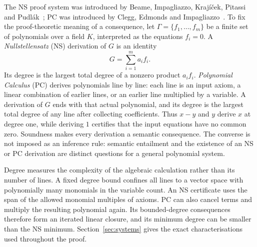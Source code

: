 \documentclass[11pt,a4paper]{article}
\theoremstyle{definition}\newtheorem{definition}[theorem]{Definition}
\theoremstyle{remark}\newtheorem{remark}[theorem]{Remark}
\begin{document}
The NS proof system was introduced by Beame, Impagliazzo,
Kraj\'i\v cek, Pitassi and Pudl\'ak~\cite{NSFoundations}; PC was
introduced by Clegg, Edmonds and Impagliazzo~\cite{PCFoundations}.
To fix the proof-theoretic meaning of a consequence, let
$\Gamma=\{f_1,\ldots,f_m\}$ be a finite set of polynomials over a field
$K$, interpreted as the equations $f_i=0$. A \emph{Nullstellensatz}
(NS) derivation of $G$ is an identity
\[
                         G=\sum_{i=1}^m a_i f_i.
\]
Its degree is the largest total degree of a nonzero product $a_i f_i$.
\emph{Polynomial Calculus} (PC) derives polynomials line by line: each
line is an input axiom, a linear combination of earlier lines, or an
earlier line multiplied by a variable. A derivation of $G$ ends with
that actual polynomial, and its degree is the largest total degree
of any line after collecting coefficients. Thus $x-y$ and $y$ derive
$x$ at degree one, while deriving $1$ certifies that the input equations
have no common zero. Soundness makes every derivation a semantic
consequence. The converse is not imposed as an inference rule:
semantic entailment and the existence of an NS or PC derivation are
distinct questions for a general polynomial system.

Degree measures the complexity of the algebraic calculation rather
than its number of lines. A fixed degree bound confines all lines to
a vector space with polynomially many monomials in the variable count.
An NS certificate uses the span of the allowed monomial multiples of
axioms. PC can also cancel terms and multiply the resulting polynomial
again. Its bounded-degree consequences therefore form an iterated
linear closure, and its minimum degree can be smaller than the NS
minimum. Section~\ref{sec:systems} gives the exact characterisations
used throughout the proof.
\end{document}

